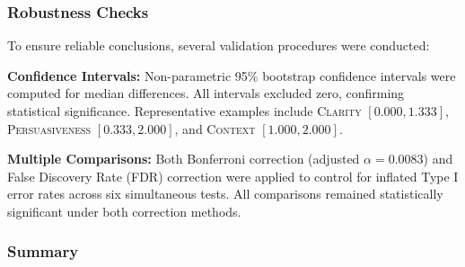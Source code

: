 \subsubsection{Robustness Checks}

To ensure reliable conclusions, several validation procedures were conducted:

\textbf{Confidence Intervals:} Non-parametric 95\% bootstrap confidence intervals were computed for median differences. All intervals excluded zero, confirming statistical significance. Representative examples include \textsc{Clarity} $[0.000, 1.333]$, \textsc{Persuasiveness} $[0.333, 2.000]$, and \textsc{Context} $[1.000, 2.000]$.

\textbf{Multiple Comparisons:} Both Bonferroni correction (adjusted $\alpha = 0.0083$) and False Discovery Rate (FDR) correction were applied to control for inflated Type I error rates across six simultaneous tests. All comparisons remained statistically significant under both correction methods.

\subsubsection{Summary}

